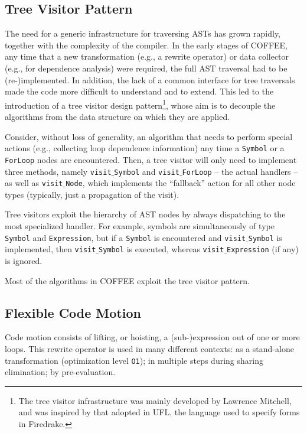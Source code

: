 \subsection{Tree Visitor Pattern}
The need for a generic infrastructure for traversing ASTs has grown rapidly, together with the complexity of the compiler. In the early stages of COFFEE, any time that a new transformation (e.g., a rewrite operator) or data collector (e.g., for dependence analysis) were required, the full AST traversal had to be (re-)implemented. In addition, the lack of a common interface for tree traversals made the code more difficult to understand and to extend. This led to the introduction of a tree visitor design pattern\footnote{The tree visitor infrastructure was mainly developed by Lawrence Mitchell, and was inspired by that adopted in UFL, the language used to specify forms in Firedrake.}, whose aim is to decouple the algorithms from the data structure on which they are applied. 

Consider, without loss of generality, an algorithm that needs to perform special actions (e.g., collecting loop dependence information) any time a \texttt{Symbol} or a \texttt{ForLoop} nodes are encountered. Then, a tree visitor will only need to implement three methods, namely \texttt{visit$\_$Symbol} and \texttt{visit$\_$ForLoop} -- the actual handlers -- as well as \texttt{visit$\_$Node}, which implements the ``fallback'' action for all other node types (typically, just a propagation of the visit).

Tree visitors exploit the hierarchy of AST nodes by always dispatching to the most specialized handler. For example, symbols are simultaneously of type \texttt{Symbol} and \texttt{Expression}, but if a \texttt{Symbol} is encountered and \texttt{visit$\_$Symbol} is implemented, then \texttt{visit$\_$Symbol} is executed, whereas \texttt{visit$\_$Expression} (if any) is ignored.

Most of the algorithms in COFFEE exploit the tree visitor pattern.

\subsection{Flexible Code Motion}
\label{sec:coffee:cm}
Code motion consists of lifting, or hoisting, a (sub-)expression out of one or more loops. This rewrite operator is used in many different contexts: as a stand-alone transformation (optimization level \texttt{O1}); in multiple steps during sharing elimination; by pre-evaluation. 

